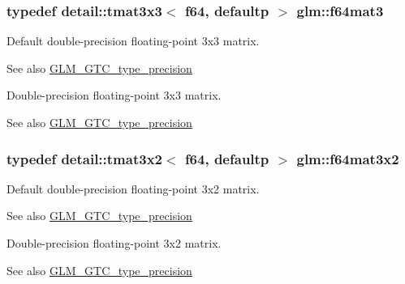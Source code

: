 \subsubsection[{\texorpdfstring{f64mat3}{f64mat3}}]{\setlength{\rightskip}{0pt plus 5cm}typedef detail\+::tmat3x3$<$ f64, defaultp $>$ {\bf glm\+::f64mat3}}\hypertarget{group__gtc__type__precision_gaa9e69ab90c0130b9a84a0a7fd8e49664}{}\label{group__gtc__type__precision_gaa9e69ab90c0130b9a84a0a7fd8e49664}
Default double-\/precision floating-\/point 3x3 matrix. \begin{DoxySeeAlso}{See also}
\hyperlink{group__gtc__type__precision}{G\+L\+M\+\_\+\+G\+T\+C\+\_\+type\+\_\+precision}
\end{DoxySeeAlso}
Double-\/precision floating-\/point 3x3 matrix. \begin{DoxySeeAlso}{See also}
\hyperlink{group__gtc__type__precision}{G\+L\+M\+\_\+\+G\+T\+C\+\_\+type\+\_\+precision} 
\end{DoxySeeAlso}
\subsubsection[{\texorpdfstring{f64mat3x2}{f64mat3x2}}]{\setlength{\rightskip}{0pt plus 5cm}typedef detail\+::tmat3x2$<$ f64, defaultp $>$ {\bf glm\+::f64mat3x2}}\hypertarget{group__gtc__type__precision_gae6388c7664b5bb281047a9fd7984f97b}{}\label{group__gtc__type__precision_gae6388c7664b5bb281047a9fd7984f97b}
Default double-\/precision floating-\/point 3x2 matrix. \begin{DoxySeeAlso}{See also}
\hyperlink{group__gtc__type__precision}{G\+L\+M\+\_\+\+G\+T\+C\+\_\+type\+\_\+precision}
\end{DoxySeeAlso}
Double-\/precision floating-\/point 3x2 matrix. \begin{DoxySeeAlso}{See also}
\hyperlink{group__gtc__type__precision}{G\+L\+M\+\_\+\+G\+T\+C\+\_\+type\+\_\+precision} 
\end{DoxySeeAlso}
